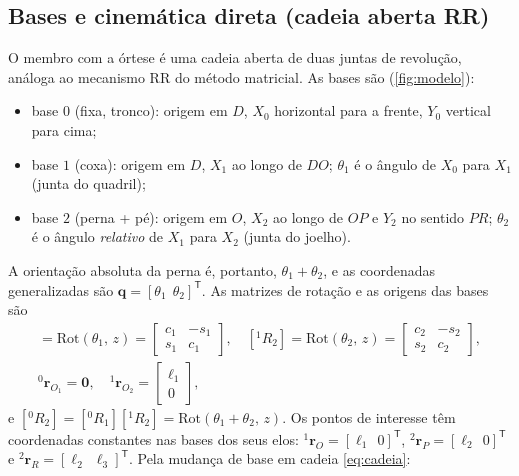 \documentclass[12pt,a4paper,twoside]{article}
\newcommand{\rv}[2]{{}^{#1}\mathbf{r}_{#2}}          %
\newcommand{\Rm}[2]{[{}^{#1}R_{#2}]}                 %
\newcommand{\Rot}[2]{\mathrm{Rot}(#1,\,#2)}
\numberwithin{equation}{section}
\begin{document}
\subsection{Bases e cinemática direta (cadeia aberta RR)}

O membro com a órtese é uma cadeia aberta de duas juntas de revolução, análoga ao
mecanismo RR do método matricial. As bases são (\cref{fig:modelo}):
\begin{itemize}
  \item base $0$ (fixa, tronco): origem em $D$, $X_0$ horizontal para a frente, $Y_0$
  vertical para cima;
  \item base $1$ (coxa): origem em $D$, $X_1$ ao longo de $DO$; $\theta_1$ é o ângulo de $X_0$
  para $X_1$ (junta do quadril);
  \item base $2$ (perna + pé): origem em $O$, $X_2$ ao longo de $OP$ e $Y_2$ no sentido $PR$;
  $\theta_2$ é o ângulo \emph{relativo} de $X_1$ para $X_2$ (junta do joelho).
\end{itemize}
A orientação absoluta da perna é, portanto, $\theta_1 + \theta_2$, e as coordenadas
generalizadas são $\mathbf q = [\theta_1\ \ \theta_2]^{\mathsf T}$. As matrizes de rotação e as origens
das bases são
\begin{gather}
  \Rm{0}{1} = \Rot{\theta_1}{z} = \begin{bmatrix} c_1 & -s_1 \\ s_1 & c_1 \end{bmatrix},\quad
  \Rm{1}{2} = \Rot{\theta_2}{z} = \begin{bmatrix} c_2 & -s_2 \\ s_2 & c_2 \end{bmatrix},\\
  \rv{0}{O_1} = \mathbf 0,\quad \rv{1}{O_2} = \begin{bmatrix} \ell_1 \\ 0 \end{bmatrix},
\end{gather}
e $\Rm{0}{2} = \Rm{0}{1}\Rm{1}{2} = \Rot{\theta_1+\theta_2}{z}$. Os pontos de interesse têm coordenadas
constantes nas bases dos seus elos: $\rv{1}{O} = [\ell_1\ \ 0]^{\mathsf T}$, $\rv{2}{P} = [\ell_2\ \ 0]^{\mathsf T}$ e
$\rv{2}{R} = [\ell_2\ \ \ell_3]^{\mathsf T}$. Pela mudança de base em cadeia \eqref{eq:cadeia}:
\end{document}
